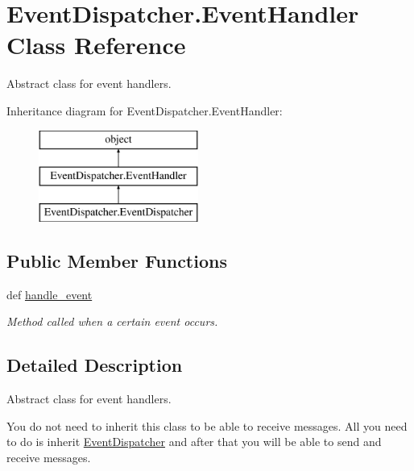 \hypertarget{class_event_dispatcher_1_1_event_handler}{\section{Event\-Dispatcher.\-Event\-Handler Class Reference}
\label{class_event_dispatcher_1_1_event_handler}
}


Abstract class for event handlers.  


Inheritance diagram for Event\-Dispatcher.\-Event\-Handler\-:\begin{figure}[H]
\begin{center}
\leavevmode
\includegraphics[height=3.000000cm]{class_event_dispatcher_1_1_event_handler}
\end{center}
\end{figure}
\subsection*{Public Member Functions}
\begin{DoxyCompactItemize}
\item 
def \hyperlink{class_event_dispatcher_1_1_event_handler_a3bb939e88fbffb1671c192e77430fa7b}{handle\-\_\-event}
\begin{DoxyCompactList}\small\item\em Method called when a certain event occurs. \end{DoxyCompactList}\end{DoxyCompactItemize}


\subsection{Detailed Description}
Abstract class for event handlers. 

You do not need to inherit this class to be able to receive messages. All you need to do is inherit \hyperlink{class_event_dispatcher_1_1_event_dispatcher}{Event\-Dispatcher} and after that you will be able to send and receive messages. 

